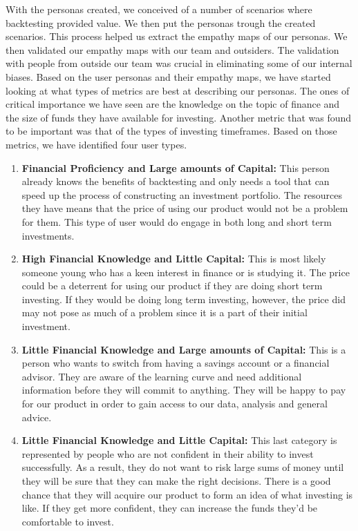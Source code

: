 \documentclass[main.tex]{subfiles}
\begin{document}
With the personas created, we conceived of a number of scenarios where backtesting provided value. We then put the personas trough the created scenarios. This process helped us extract the empathy maps \cite{empathy_maps} of our personas. We then validated our empathy maps with our team and outsiders. The validation with people from outside our team was crucial in eliminating some of our internal biases.
Based on the user personas and their empathy maps, we have started looking at what types of metrics are best at describing our personas. The ones of critical importance we have seen are the knowledge on the topic of finance and the size of funds they have available for investing. Another metric that was found to be important was that of the types of investing timeframes. Based on those metrics, we have identified four user types.

\begin{enumerate}
    \item \textbf{Financial Proficiency and Large amounts of Capital:  }This person already knows the benefits of backtesting and only needs a tool that can speed up the process of constructing an investment portfolio. The resources they have means that the price of using our product would not be a problem for them. This type of user would do engage in both long and short term investments.
    \item \textbf{High Financial Knowledge and Little Capital:  } This is most likely someone young who has a keen interest in finance or is studying it. The price could be a deterrent for using our product if they are doing short term investing. If they would be doing long term investing, however, the price did may not pose as much of a problem since it is a part of their initial investment.
    \item \textbf{Little Financial Knowledge and Large amounts of Capital:  }This is a person who wants to switch from having a savings account or a financial advisor. They are aware of the learning curve and need additional information before they will commit to anything. They will be happy to pay for our product in order to gain access to our data, analysis and general advice.
    \item \textbf{Little Financial Knowledge and Little Capital:  }This  last category is represented by people who are not confident in their ability to invest successfully. As a result, they do not want to risk large sums of money until they will be sure that they can make the right decisions. There is a good chance that they will acquire our product to form an idea of what investing is like. If they get more confident, they can increase the funds they'd be comfortable to invest.
\end{enumerate}
\end{document}
